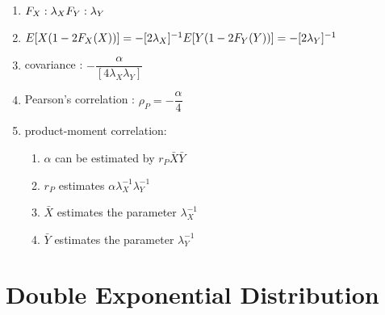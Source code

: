 \begin{enumerate}[itemsep=0.2cm]
    \item $
            \hfill
            F_X : \lambda_X
            \hfill
            F_Y : \lambda_Y
            \hfill
        $

    \item $
            \hfill
            E[X(1 - 2F_X(X))] = -[2\lambda_X]^{-1}
            \hfill
            E[Y(1 - 2F_Y(Y))] = -[2\lambda_Y]^{-1}
            \hfill
        $

    \item covariance   : $-\dfrac{\alpha}{[4\lambda_X\lambda_Y]}$

    \item Pearson’s correlation : $\rho_P = -\dfrac{\alpha}{4}$

    \item product-moment correlation:
    \begin{enumerate}[itemsep=0.2cm]
        \item $\alpha$ can be estimated by $r_P\bar{X}\bar{Y}$

        \item $r_P$ estimates $\alpha\lambda _X^{-1}\lambda_Y^{-1}$

        \item $\bar{X}$ estimates the parameter $\lambda_X^{-1}$

        \item $\bar{Y}$ estimates the parameter $\lambda_Y^{-1}$
    \end{enumerate}

\end{enumerate}


\section{Double Exponential Distribution \cite{ism-1}} \label{Double Exponential Distribution}

